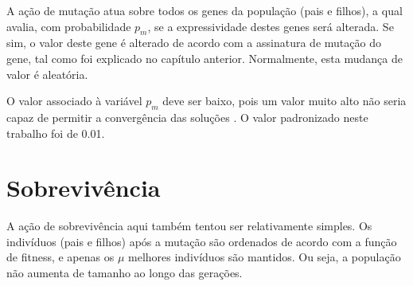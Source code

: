 A ação de mutação atua sobre todos os genes da população (pais e filhos), a qual avalia, com probabilidade $p_m$, se a expressividade destes genes será alterada. Se sim, o valor deste gene é alterado de acordo com a assinatura de mutação do gene, tal como foi explicado no capítulo anterior. Normalmente, esta mudança de valor é aleatória.

O valor associado à variável $p_m$ deve ser baixo, pois um valor muito alto não seria capaz de permitir a convergência das soluções \cite{dejong1975analysis, eiben2011parameter, obitkopc}. O valor padronizado neste trabalho foi de 0.01.

\section{Sobrevivência}

A ação de sobrevivência aqui também tentou ser relativamente simples. Os indivíduos (pais e filhos) após a mutação são ordenados de acordo com a função de fitness, e apenas os $\mu$ melhores indivíduos são mantidos. Ou seja, a população não aumenta de tamanho ao longo das gerações.

